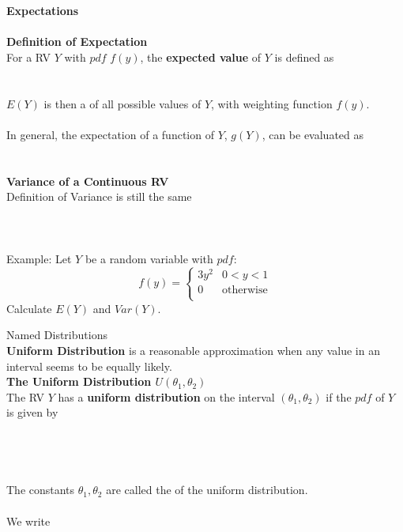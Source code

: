 \huge \textbf{Expectations} \normalsize\\~\\
\textbf{Definition of Expectation}\\
For a RV $Y$ with $pdf$ $f(y)$, the \textbf{expected value} of $Y$ is defined as\\~\\~\\
$E(Y)$ is then a \underbar{~~~~~~~~~~~~~~~~~~~~~~~~~~~~~~~~~~~~~~~~~~~~~~~~~~~~~~~}  of all possible values of $Y$, with weighting function $f(y)$.\\~\\
In general, the expectation of a {function} of $Y$, $g(Y)$, can be evaluated as\\~\\~\\

\textbf{Variance of a Continuous RV}\\
Definition of Variance is still the same\\~\\~\\~\\
Example:  Let $Y$ be a random variable with $pdf$:
$$f(y) = \left\{\begin{array}{lc}
           3y^2 & 0<y<1 \\
           0 & \mbox{otherwise}\\
         \end{array}\right.$$
Calculate $E(Y)$ and $Var(Y)$.

\pagebreak

\huge Named Distributions \normalsize\\
\textbf{Uniform Distribution} is a reasonable approximation when any value in an interval seems to be equally likely.\\

\large \textbf{The Uniform Distribution $U(\theta_1,\theta_2)$}\normalsize\\
The RV $Y$ has a \textbf{uniform distribution} on the interval $(\theta_1,\theta_2)$ if the $pdf$ of $Y$
is given by\\~\\~\\~\\~\\

The constants $\theta_1,\theta_2$ are called the \underbar{~~~~~~~~~~~~~~~~~~~~~~~~~~~~~~~~~~~} of the uniform distribution.\\~\\
We write  \underbar{~~~~~~~~~~~~~~~~~~~~~~~~~~~~~~~~~~~~~~~~~~~~~~~~~~~~~} \\

